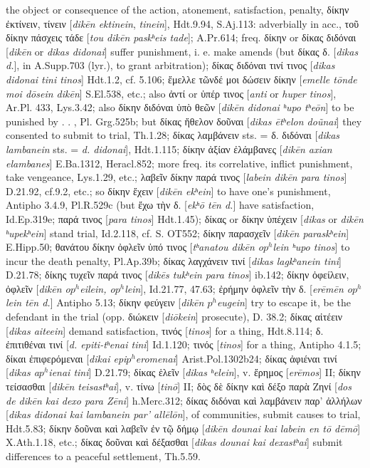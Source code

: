 \documentclass[output=paper,colorlinks,citecolor=brown]{langscibook}
\begin{document}
\glt the object or consequence of the action, atonement, satisfaction, penalty, δίκην ἐκτίνειν, τίνειν [\textit{dikēn ektinein}, \textit{tinein}], Hdt.9.94, S.Aj.113: adverbially in acc., τοῦ δίκην πάσχεις τάδε [\textit{tou dikēn paskʰeis tade}]; A.Pr.614; freq. δίκην or δίκας διδόναι [\textit{dikēn} or \textit{dikas didonai}] suffer punishment, i. e. make amends (but δίκας δ. [\textit{dikas d.}], in A.Supp.703 (lyr.), to grant arbitration); δίκας διδόναι τινί τινος [\textit{dikas didonai tini tinos}] Hdt.1.2, cf. 5.106; ἔμελλε τῶνδέ μοι δώσειν δίκην [\textit{emelle tōnde moi dōsein dikēn}] S.El.538, etc.; also ἀντί or ὑπέρ τινος [\textit{anti} or \textit{huper tinos}], Ar.Pl. 433, Lys.3.42; also δίκην διδόναι ὑπὸ θεῶν [\textit{dikēn didonai ʰupo tʰeōn}] to be punished by . . , Pl. Grg.525b; but δίκας ἤθελον δοῦναι [\textit{dikas ētʰelon doũnai}] they consented to submit to trial, Th.1.28; δίκας λαμβάνειν sts. = δ. διδόναι [\textit{dikas lambanein} sts. = \textit{d. didonai}], Hdt.1.115; δίκην ἀξίαν ἐλάμβανες [\textit{dikēn axian elambanes}] E.Ba.1312, Heracl.852; more freq. its correlative, inflict punishment, take vengeance, Lys.1.29, etc.; λαβεῖν δίκην παρά τινος [\textit{labein dikēn para tinos}] D.21.92, cf.9.2, etc.; so δίκην ἔχειν [\textit{dikēn ekʰein}] to have one's punishment, Antipho 3.4.9, Pl.R.529c (but ἔχω τὴν δ. [\textit{ekʰō tēn d.}] have satisfaction, Id.Ep.319e; παρά τινος [\textit{para tinos}] Hdt.1.45); δίκας or δίκην ὑπέχειν [\textit{dikas} or \textit{dikēn ʰupekʰein}] stand trial, Id.2.118, cf. S. OT552; δίκην παρασχεῖν [\textit{dikēn paraskʰein}] E.Hipp.50; θανάτου δίκην ὀφλεῖν ὑπό τινος [\textit{tʰanatou dikēn o$p^h$lein ʰupo tinos}] to incur the death penalty, Pl.Ap.39b; δίκας λαγχάνειν τινί [\textit{dikas lagkʰanein tini}] D.21.78; δίκης τυχεῖν παρά τινος [\textit{dikēs tukʰein para tinos}] ib.142; δίκην ὀφείλειν, ὀφλεῖν [\textit{dikēn o$p^h$eilein, o$p^h$lein}], Id.21.77, 47.63; ἐρήμην ὀφλεῖν τὴν δ. [\textit{erēmēn o$p^h$lein tēn d.}] Antipho 5.13; δίκην φεύγειν [\textit{dikēn $p^h$eugein}] try to escape it, be the defendant in the trial (opp. διώκειν [\textit{diōkein}] prosecute), D. 38.2; δίκας αἰτέειν [\textit{dikas aiteein}] demand satisfaction, τινός [\textit{tinos}] for a thing, Hdt.8.114; δ. ἐπιτιθέναι τινί [\textit{d. epiti-tʰenai tini}] Id.1.120; τινός [\textit{tinos}] for a thing, Antipho 4.1.5; δίκαι ἐπιφερόμεναι [\textit{dikai epi$p^h$eromenai}] Arist.Pol.1302b24; δίκας ἀφιέναι τινί [\textit{dikas a$p^h$ienai tini}] D.21.79; δίκας ἑλεῖν [\textit{dikas ʰelein}], v. ἔρημος [\textit{erēmos}] II; δίκην τείσασθαι [\textit{dikēn teisastʰai}], v. τίνω [\textit{tinō}] II; δὸς δὲ δίκην καὶ δέξο παρὰ Ζηνί [\textit{dos de dikēn kai dexo para Zēni}] h.Merc.312; δίκας διδόναι καὶ λαμβάνειν παρ’ ἀλλήλων [\textit{dikas didonai kai lambanein par’ allēlōn}], of communities, submit causes to trial, Hdt.5.83; δίκην δοῦναι καὶ λαβεῖν ἐν τῷ δήμῳ [\textit{dikēn dounai kai labein en tō dēmō}] X.Ath.1.18, etc.; δίκας δοῦναι καὶ δέξασθαι [\textit{dikas dounai kai dexastʰai}] submit differences to a peaceful settlement, Th.5.59.
\end{document}
